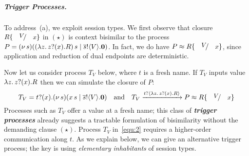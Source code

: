\documentclass[a4paper,UKenglish]{lipics}
\theoremstyle{definition}
\begin{document}
\subparagraph{Trigger Processes.} %
To address~(a), we exploit session types. 
We first 
observe that closure $R\subst{V}{x}$ 
in $(\star)$
is context bisimilar to the process
	$P = (\nu\, s)((\lambda z.\,z ? (x) .{R})\, {s} \;|\; \overline{s} ! \langle V \rangle . \mathbf{0})$.
In fact,
we do have $P \wbc R\subst{V}{x}$, 
since 
application and 
reduction of 
dual endpoints 
are deterministic.  

Now let us
consider process $T_{V}$ below, where $t$ is a fresh name.  
If $T_{V}$ inputs value $\lambda z.\,z ? (x) . R$ then
we can simulate the closure of $P$:
\begin{equation}\label{equ:2}
T_{V} = \hotrigger{t}{x}{s}{V} \quad\mbox{and}\quad 
T_{V}
\by{\bactinp{t}{\abs{z}{\binp{z}{x} R}}} P 
\wbc 
R\subst{V}{x}
\end{equation}
Processes such as $T_{V}$ 
offer a value at a fresh name; this class of 
{\bf\em trigger processes} 
already suggests a tractable formulation of 
bisimilarity without the demanding 
clause $(\star)$. 
Process $T_{V}$ in~\eqref{equ:2} requires a higher-order communication along $t$.
As we explain below, we can give an alternative trigger process; the key is using \emph{elementary inhabitants} of session types.

\smallskip

\end{document}
